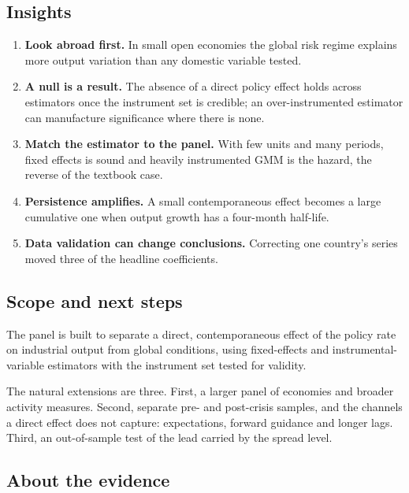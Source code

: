 \documentclass[
  british,
  a4paper,
]{article}
\newcounter{none} %
\providecommand{\tightlist}{%
  \setlength{\itemsep}{0pt}\setlength{\parskip}{0pt}}
\begin{document}
\subsection{Insights}\label{insights}

\begin{enumerate}
\def\labelenumi{\arabic{enumi}.}
\tightlist
\item
  \textbf{Look abroad first.} In small open economies the global risk
  regime explains more output variation than any domestic variable
  tested.
\item
  \textbf{A null is a result.} The absence of a direct policy effect
  holds across estimators once the instrument set is credible; an
  over-instrumented estimator can manufacture significance where there
  is none.
\item
  \textbf{Match the estimator to the panel.} With few units and many
  periods, fixed effects is sound and heavily instrumented GMM is the
  hazard, the reverse of the textbook case.
\item
  \textbf{Persistence amplifies.} A small contemporaneous effect becomes
  a large cumulative one when output growth has a four-month half-life.
\item
  \textbf{Data validation can change conclusions.} Correcting one
  country's series moved three of the headline coefficients.
\end{enumerate}

\subsection{Scope and next steps}\label{scope-and-next-steps}

The panel is built to separate a direct, contemporaneous effect of the
policy rate on industrial output from global conditions, using
fixed-effects and instrumental-variable estimators with the instrument
set tested for validity.

The natural extensions are three. First, a larger panel of economies and
broader activity measures. Second, separate pre- and post-crisis
samples, and the channels a direct effect does not capture:
expectations, forward guidance and longer lags. Third, an out-of-sample
test of the lead carried by the spread level.

\subsection{About the evidence}\label{about-the-evidence}
\end{document}
